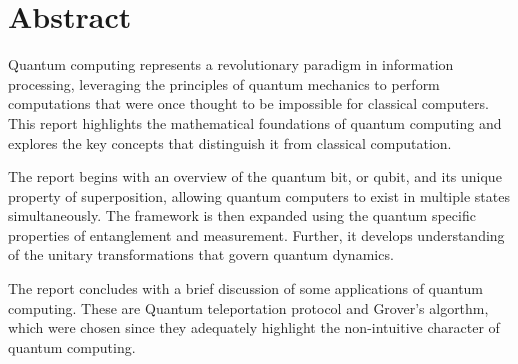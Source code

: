 \newpage

\chapter*{Abstract}

Quantum computing represents a revolutionary paradigm in information processing, leveraging the principles of quantum mechanics to perform computations that were once thought to be impossible for classical computers. This report highlights the mathematical foundations of quantum computing and explores the key concepts that distinguish it from classical computation.

The report begins with an overview of the quantum bit, or qubit, and its unique property of superposition, allowing quantum computers to exist in multiple states simultaneously. The framework is then expanded using the quantum specific properties of entanglement and measurement. Further, it develops understanding of the unitary transformations that govern quantum dynamics.

The report concludes with a brief discussion of some applications of quantum computing. These are Quantum teleportation protocol and Grover's algorthm, which were chosen since they adequately highlight the non-intuitive character of quantum computing. 
